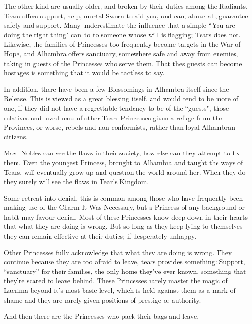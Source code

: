 The other kind are usually older, and broken by their duties among the Radiants. Tears offers support, help, mortal Sworn to aid you, and can, above all, guarantee safety and support. Many underestimate the influence that a simple \textquotedblleft You are doing the right thing" can do to someone whose will is flagging; Tears does not. Likewise, the families of Princesses too frequently become targets in the War of Hope, and Alhambra offers sanctuary, somewhere safe and away from enemies, taking in guests of the Princesses who serve them. That thes guests can become hostages is something that it would be tactless to say.

In addition, there have been a few Blossomings in Alhambra itself since the Release. This is viewed as a great blessing itself, and would tend to be more of one, if they did not have a regrettable tendency to be of the \textquotedblleft guests", those relatives and loved ones of other Tears Princesses given a refuge from the Provinces, or worse, rebels and non-conformists, rather than loyal Alhambran citizens. 

Most Nobles can see the flaws in their society, how else can they attempt to fix them. Even the youngest Princess, brought to Alhambra and taught the ways of Tears, will eventually grow up and question the world around her. When they do they surely will see the flaws in Tear's Kingdom. 

Some retreat into denial, this is common among those who have frequently been making use of the Charm It Was Necessary, but a Princess of any background or habit may favour denial. Most of these Princesses know deep down in their hearts that what they are doing is wrong. But so long as they keep lying to themselves they can remain effective at their duties; if desperately unhappy. 

Other Princesses fully acknowledge that what they are doing is wrong. They continue because they are too afraid to leave, tears provides something: Support, “sanctuary” for their families, the only home they've ever known, something that they're scared to leave behind. These Princesses rarely master the magic of Lacrima beyond it's most basic level, which is held against them as a mark of shame and they are rarely given positions of prestige or authority.

And then there are the Princesses who pack their bags and leave.  

